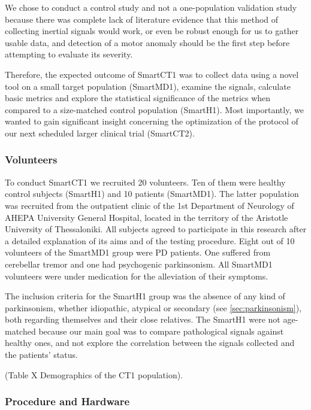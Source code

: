 We chose to conduct a control study and not a one-population validation study because there was complete lack of literature evidence that this method of collecting inertial signals would work, or even be robust enough for us to gather usable data, and detection of a motor anomaly should be the first step before attempting to evaluate its severity. 

Therefore, the expected outcome of \gls{SmartCT1} was to collect data using a novel tool on a small target population (\gls{SmartMD1}), examine the signals, calculate basic metrics and explore the statistical significance of the metrics when compared to a size-matched control population (\gls{SmartH1}). Most importantly, we wanted to gain significant insight concerning the optimization of the protocol of our next scheduled larger clinical trial (\gls{SmartCT2}).

\subsubsection{Volunteers}
\label{subsubsec:smartCT1Volunteers}

To conduct \gls{SmartCT1} we recruited 20 volunteers. Ten of them were healthy control subjects (\gls{SmartH1}) and 10 patients (\gls{SmartMD1}). The latter population was recruited from the outpatient clinic of the 1st Department of Neurology of AHEPA University General Hospital, located in the territory of the Aristotle University of Thessaloniki. All subjects agreed to participate in this research after a detailed explanation of its aims and of the testing procedure. Eight out of 10 volunteers of the \gls{SmartMD1} group were \gls{PD} patients. One suffered from cerebellar tremor and one had psychogenic parkinsonism. All \gls{SmartMD1} volunteers were under medication for the alleviation of their symptoms.

The inclusion criteria for the \gls{SmartH1} group was the absence of any kind of parkinsonism, whether idiopathic, atypical or secondary (see \ref{sec:parkinsonism}), both regarding themselves and their close relatives. The \gls{SmartH1} were not age-matched because our main goal was to compare pathological signals against healthy ones, and not explore the correlation between the signals collected and the patients' status. 

(\textcolor{BurntOrange}{Table X Demographics of the CT1 population}).

\subsubsection{Procedure and Hardware}
\label{subsubsec:smartCT1ProcHardware}

